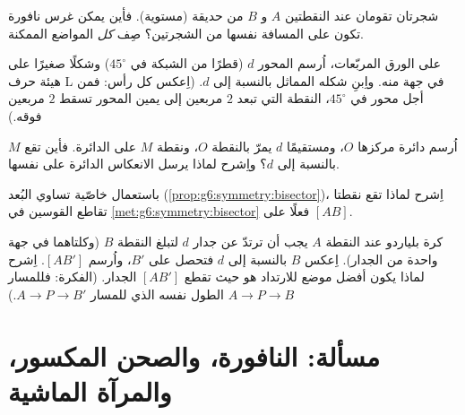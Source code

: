 \begin{exercise}[$\star\star$]\label{exo:g6:symmetry:8}
شجرتان تقومان عند النقطتين $A$ و $B$ من حديقة (مستوية). فأين يمكن
غرس نافورة تكون على المسافة نفسها من الشجرتين؟
صِف \emph{كل} المواضع الممكنة.
\end{exercise}

\begin{exercise}[$\star\star$]\label{exo:g6:symmetry:9}
على الورق المربّعات، اُرسم المحور $d$ (قطرًا من الشبكة في
$45^\circ$) وشكلًا صغيرًا على هيئة حرف L في جهة منه. واِبنِ
شكله المماثل بالنسبة إلى $d$. (اِعكس كل رأس: فمن أجل محور في $45^\circ$،
النقطة التي تبعد $2$ مربعين إلى يمين المحور تسقط $2$ مربعين فوقه.)
\end{exercise}

\begin{exercise}[$\star\star$]\label{exo:g6:symmetry:10}
اُرسم دائرة مركزها $O$، ومستقيمًا $d$ يمرّ بالنقطة $O$، ونقطة $M$ على
الدائرة. فأين تقع  $M$ بالنسبة إلى $d$؟ واِشرح لماذا
يرسل الانعكاس الدائرة على نفسها.
\end{exercise}

\begin{exercise}[$\star\star$]\label{exo:g6:symmetry:11}
باستعمال خاصّية تساوي البُعد (\cref{prop:g6:symmetry:bisector})،
اِشرح لماذا تقع نقطتا تقاطع القوسين في
\cref{met:g6:symmetry:bisector} فعلًا على   $[AB]$.
\end{exercise}

\begin{exercise}[$\star\star\star$]\label{exo:g6:symmetry:12}
كرة بلياردو عند النقطة $A$ يجب أن ترتدّ عن جدار  $d$
لتبلغ النقطة $B$ (وكلتاهما في جهة واحدة من الجدار). اِعكس $B$
بالنسبة إلى $d$ فتحصل على $B'$، واُرسم  $[AB']$. اِشرح لماذا يكون
أفضل موضع للارتداد هو حيث تقطع $[AB']$ الجدار. (الفكرة: فللمسار
$A \to P \to B$ الطول نفسه الذي للمسار $A \to P \to B'$.)
\end{exercise}

\section{مسألة: النافورة، والصحن المكسور، والمرآة
الماشية}

